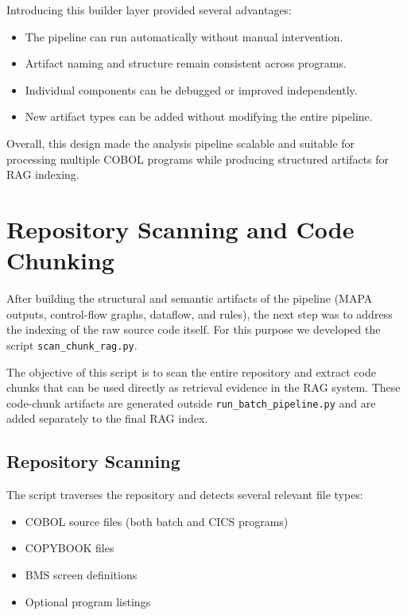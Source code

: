 \documentclass[11pt]{article}
\begin{document}
Introducing this builder layer provided several advantages:

\begin{itemize}
\item The pipeline can run automatically without manual intervention.
\item Artifact naming and structure remain consistent across programs.
\item Individual components can be debugged or improved independently.
\item New artifact types can be added without modifying the entire pipeline.
\end{itemize}

Overall, this design made the analysis pipeline scalable and suitable for processing multiple COBOL programs while producing structured artifacts for RAG indexing.




\section{Repository Scanning and Code Chunking}
\label{sec:chunking}

After building the structural and semantic artifacts of the pipeline (MAPA outputs, control-flow graphs, dataflow, and rules), the next step was to address the indexing of the raw source code itself. For this purpose we developed the script \texttt{scan\_chunk\_rag.py}.

The objective of this script is to scan the entire repository and extract code chunks that can be used directly as retrieval evidence in the RAG system.
These code-chunk artifacts are generated outside \texttt{run\_batch\_pipeline.py} and are added separately to the final RAG index.

\subsection*{Repository Scanning}

The script traverses the repository and detects several relevant file types:

\begin{itemize}
\item COBOL source files (both batch and CICS programs)
\item COPYBOOK files
\item BMS screen definitions
\item Optional program listings
\end{itemize}
\end{document}
